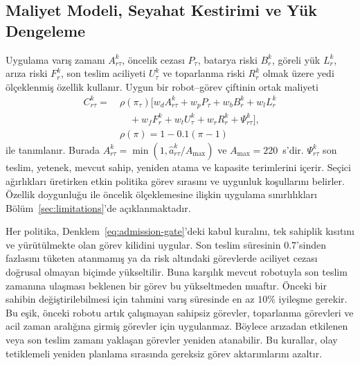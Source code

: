 \documentclass[10pt,letterpaper,onecolumn]{IEEEtran}
\begin{document}
\subsection{Maliyet Modeli, Seyahat Kestirimi ve Yük Dengeleme}

Uygulama varış zamanı $A_{r\tau}^k$, öncelik cezası $P_\tau$, batarya riski
$B_r^k$, göreli yük $L_r^k$, arıza riski $F_r^k$, son teslim aciliyeti
$U_\tau^k$ ve toparlanma riski $R_r^k$ olmak üzere yedi ölçeklenmiş özellik
kullanır. Uygun bir robot--görev çiftinin ortak maliyeti
\begin{equation}
\begin{aligned}
  C_{r\tau}^k =\ &\rho(\pi_\tau)\bigl[
  w_dA_{r\tau}^k+w_pP_\tau+w_bB_r^k+w_lL_r^k\\
  &\quad+w_fF_r^k+w_tU_\tau^k+w_rR_r^k+\Psi_{r\tau}^k\bigr],\\
  &\rho(\pi)=1-0.1(\pi-1)
\end{aligned}
  \label{eq:cost}
\end{equation}
ile tanımlanır. Burada
$A_{r\tau}^k=\min(1,\hat a_{r\tau}^k/A_{\max})$ ve
$A_{\max}=220$~s'dir. $\Psi_{r\tau}^k$ son teslim, yetenek, mevcut sahip,
yeniden atama ve kapasite terimlerini içerir. Seçici ağırlıkları üretirken
etkin politika görev sırasını ve uygunluk koşullarını belirler. Özellik
doygunluğu ile öncelik ölçeklemesine ilişkin uygulama sınırlılıkları
Bölüm~\ref{sec:limitations}'de açıklanmaktadır.

Her politika, Denklem~\eqref{eq:admission-gate}'deki kabul kuralını,
tek sahiplik kısıtını ve yürütülmekte olan görev kilidini uygular. Son teslim
süresinin $0.7$'sinden fazlasını tüketen
atanmamış ya da risk altındaki görevlerde aciliyet cezası doğrusal olmayan
biçimde yükseltilir. Buna karşılık mevcut robotuyla son teslim zamanına
ulaşması beklenen bir görev bu yükseltmeden muaftır. Önceki bir sahibin
değiştirilebilmesi için tahmini varış süresinde en az $10\%$ iyileşme gerekir.
Bu eşik, önceki robotu artık çalışmayan sahipsiz görevler, toparlanma görevleri
ve acil zaman aralığına girmiş görevler için uygulanmaz. Böylece arızadan
etkilenen veya son teslim zamanı yaklaşan görevler yeniden atanabilir. Bu
kurallar, olay tetiklemeli yeniden planlama sırasında gereksiz görev
aktarımlarını azaltır.

\label{sec:geodesic-repair}
\end{document}
